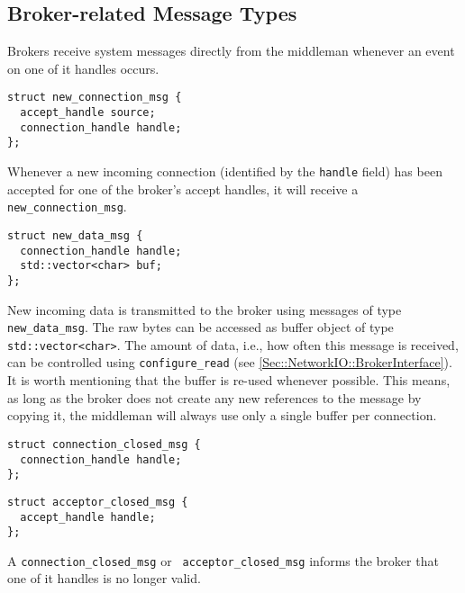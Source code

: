 \clearpage
\subsection{Broker-related Message Types}

Brokers receive system messages directly from the middleman whenever an event on one of it handles occurs.

\begin{lstlisting}
struct new_connection_msg {
  accept_handle source;
  connection_handle handle;
};
\end{lstlisting}

Whenever a new incoming connection (identified by the \lstinline^handle^ field) has been accepted for one of the broker's accept handles, it will receive a \lstinline^new_connection_msg^.

\begin{lstlisting}
struct new_data_msg {
  connection_handle handle;
  std::vector<char> buf;
};
\end{lstlisting}

New incoming data is transmitted to the broker using messages of type \lstinline^new_data_msg^.
The raw bytes can be accessed as buffer object of type \lstinline^std::vector<char>^.
The amount of data, i.e., how often this message is received, can be controlled using \lstinline^configure_read^ (see \ref{Sec::NetworkIO::BrokerInterface}).
It is worth mentioning that the buffer is re-used whenever possible.
This means, as long as the broker does not create any new references to the message by copying it, the middleman will always use only a single buffer per connection.

\begin{lstlisting}
struct connection_closed_msg {
  connection_handle handle;
};
\end{lstlisting}

\begin{lstlisting}
struct acceptor_closed_msg {
  accept_handle handle;
};
\end{lstlisting}


A \lstinline^connection_closed_msg^ or \lstinline^ acceptor_closed_msg^ informs the broker that one of it handles is no longer valid.
